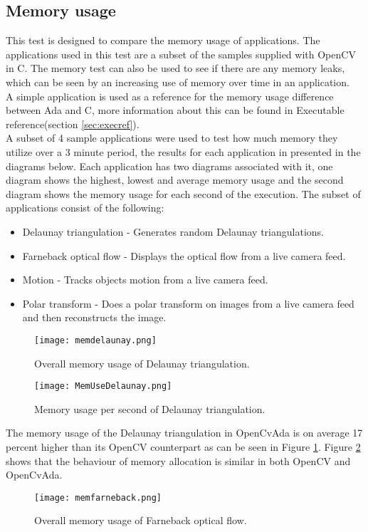 \subsection{Memory usage}
This test is designed to compare the memory usage of applications. The applications used in this test are a subset of the samples supplied with OpenCV in C. The memory test can also be used to see if there are any memory leaks, which can be seen by an increasing use of memory over time in an application.
\\
A simple application is used as a reference for the memory usage difference between Ada and C, more information about this can be found in Executable reference(section \ref{sec:execref}).
\\
A subset of 4 sample applications were used to test how much memory they utilize over a 3 minute period, the results for each application in presented in the diagrams below. Each application has two diagrams associated with it, one diagram shows the highest, lowest and average memory usage and the second diagram shows the memory usage for each second of the execution.
The subset of applications consist of the following:
\begin{itemize}
\item Delaunay triangulation - Generates random Delaunay triangulations.
\item Farneback optical flow - Displays the optical flow from a live camera feed.
\item Motion - Tracks objects motion from a live camera feed.
\item Polar transform - Does a polar transform on images from a live camera feed and then reconstructs the image.
\end{itemize}
\begin{figure}
\centering
\texttt{[image: memdelaunay.png]}
\caption{Overall memory usage of Delaunay triangulation.}
\label{fig:memdelaunay}
\end{figure}
\begin{figure}
\centering
\texttt{[image: MemUseDelaunay.png]}
\caption{Memory usage per second of Delaunay triangulation.}
\label{fig:MemUseDelaunay}
\end{figure}
The memory usage of the Delaunay triangulation in OpenCvAda is on average 17 percent higher than its OpenCV counterpart as can be seen in Figure \ref{fig:memdelaunay}. Figure \ref{fig:MemUseDelaunay} shows that the behaviour of memory allocation is similar in both OpenCV and OpenCvAda.
\begin{figure}
\centering
\texttt{[image: memfarneback.png]}
\caption{Overall memory usage of Farneback optical flow.}
\label{fig:memfarneback}
\end{figure}

